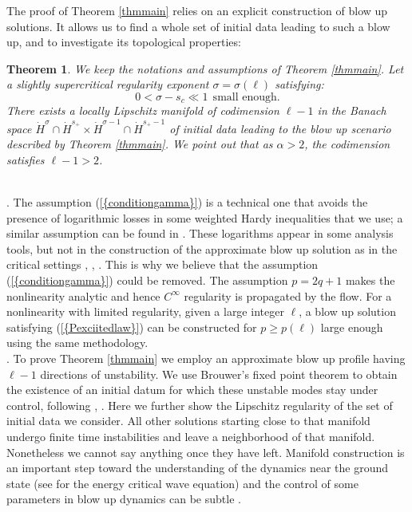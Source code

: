 \documentclass[11pt,a4paper,reqno]{amsart}
\newtheorem{theorem}{Theorem}[section]
\theoremstyle{remark}
\numberwithin{equation}{section}
\begin{document}
The proof of Theorem \ref{thmmain} relies on an explicit construction of blow up solutions. It allows us to find a whole set of initial data leading to such a blow up, and to investigate its topological properties:

\begin{theorem} \label{thmmain2}
We keep the notations and assumptions of Theorem \ref{thmmain}. Let a slightly supercritical regularity exponent $\sigma=\sigma(\ell)$ satisfying:
$$
0<\sigma-s_c\ll 1 \ \ \text{small enough}.
$$
There exists a locally Lipschitz manifold of codimension $\ell-1$ in the Banach space $\dot{H}^{\sigma}\cap \dot{H}^{s_+}\times \dot{H}^{\sigma-1}\cap \dot{H}^{s_+-1}$ of initial data leading to the blow up scenario described by Theorem \ref{thmmain}. We point out that as $\alpha>2$, the codimension satisfies $\ell-1>2$.
\end{theorem}

\\

. The assumption {{\rm (\ref{{conditiongamma}})}} is a technical one that avoids the presence of logarithmic losses in some weighted Hardy inequalities that we use; a similar assumption can be found in \cite{MRRod2}. These logarithms appear in some analysis tools, but not in the construction of the approximate blow up solution as in the critical settings \cite{HR}, \cite{RaphRod}, \cite{MRRod1}. This is why we believe that the assumption {{\rm (\ref{{conditiongamma}})}} could be removed. The assumption $p=2q+1$ makes the nonlinearity analytic and hence $ C^{\infty}$ regularity is propagated by the flow. For a nonlinearity with limited regularity, given a large integer $\ell$, a blow up solution satisfying {{\rm (\ref{{Pexciitedlaw}})}} can be constructed for $p\geq p(\ell)$ large enough using the same methodology.\\

. To prove Theorem \ref{thmmain} we employ an approximate blow up profile having $\ell -1$ directions of unstability. We use Brouwer's fixed point theorem to obtain the existence of an initial datum for which these unstable modes stay under control, following \cite{MRRod2}, \cite{RSc2}. Here we further show the Lipschitz regularity of the set of initial data we consider. All other solutions starting close to that manifold undergo finite time instabilities and leave a neighborhood of that manifold. Nonetheless we cannot say anything once they have left. Manifold construction is an important step toward the understanding of the dynamics near the ground state (see \cite{KNS} for the energy critical wave equation) and the control of some parameters in blow up dynamics can be subtle \cite{KS3}.\\
\end{document}
